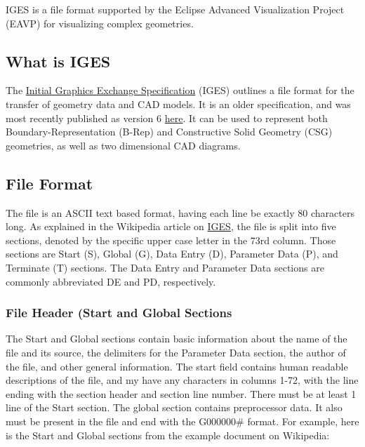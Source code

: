 IGES is a file format supported by the Eclipse Advanced Visualization
Project (EAVP) for visualizing complex geometries.

\subsection{What is IGES}\label{what-is-iges}

The \href{https://en.wikipedia.org/wiki/IGES}{Initial Graphics Exchange
Specification} (IGES) outlines a file format for the transfer of
geometry data and CAD models. It is an older specification, and was most
recently published as version 6
\href{https://filemonger.com/specs/igs/devdept.com/version6.pdf}{here}.
It can be used to represent both Boundary-Representation (B-Rep) and
Constructive Solid Geometry (CSG) geometries, as well as two dimensional
CAD diagrams.

\subsection{File Format}\label{file-format}

The file is an ASCII text based format, having each line be exactly 80
characters long. As explained in the Wikipedia article on
\href{https://en.wikipedia.org/wiki/IGES}{IGES}, the file is split into
five sections, denoted by the specific upper case letter in the 73rd
column. Those sections are Start (S), Global (G), Data Entry (D),
Parameter Data (P), and Terminate (T) sections. The Data Entry and
Parameter Data sections are commonly abbreviated DE and PD,
respectively.

\subsubsection{File Header (Start and Global
Sections}\label{file-header-start-and-global-sections}

The Start and Global sections contain basic information about the name
of the file and its source, the delimiters for the Parameter Data
section, the author of the file, and other general information. The
start field contains human readable descriptions of the file, and my
have any characters in columns 1-72, with the line ending with the
section header and section line number. There must be at least 1 line of
the Start section. The global section contains preprocessor data. It
also must be present in the file and end with the G000000\# format. For
example, here is the Start and Global sections from the example document
on Wikipedia:


